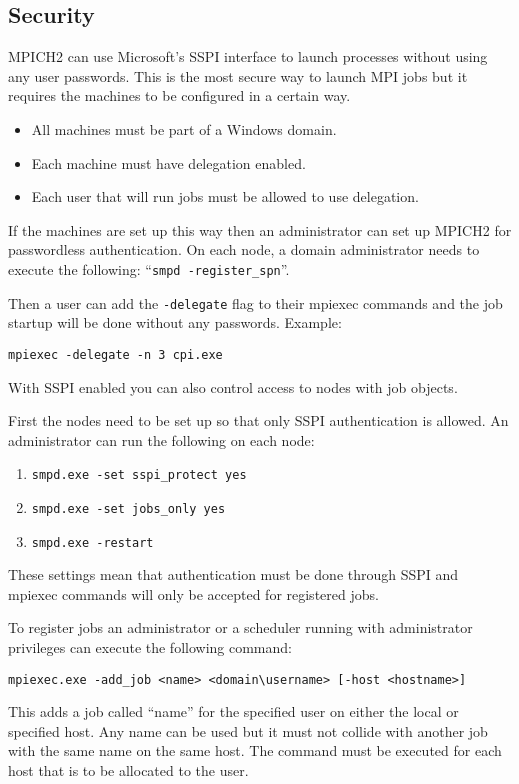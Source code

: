 \documentclass[dvipdfm,11pt]{article}
\begin{document}
\subsection{Security}
MPICH2 can use Microsoft's SSPI interface to launch processes without using any user 
passwords.  This is the most secure way to launch MPI jobs but it requires the machines to be 
configured in a certain way.
\begin{itemize}
\item All machines must be part of a Windows domain.
\item Each machine must have delegation enabled.
\item Each user that will run jobs must be allowed to use delegation.
\end{itemize}

If the machines are set up this way then an administrator can set up MPICH2 for passwordless
authentication.  On each node, a domain administrator needs to execute the following:
``\texttt{smpd -register\_spn}''.

Then a user can add the \texttt{-delegate} flag to their mpiexec commands and the job startup 
will be done without any passwords.  Example:
\begin{verbatim}
mpiexec -delegate -n 3 cpi.exe
\end{verbatim}

With SSPI enabled you can also control access to nodes with job objects.

First the nodes need to be set up so that only SSPI authentication is allowed.  An administrator
can run the following on each node:
\begin{enumerate}
\item \texttt{smpd.exe -set sspi\_protect yes}
\item \texttt{smpd.exe -set jobs\_only yes}
\item \texttt{smpd.exe -restart}
\end{enumerate}

These settings mean that authentication must be done through SSPI and mpiexec commands will only be
accepted for registered jobs.

To register jobs an administrator or a scheduler running with administrator privileges can execute
the following command:
\begin{verbatim}
mpiexec.exe -add_job <name> <domain\username> [-host <hostname>]
\end{verbatim}
This adds a job called ``name'' for the specified user on either the local or specified host.  Any
name can be used but it must not collide with another job with the same name on the same host.  The
command must be executed for each host that is to be allocated to the user.
\end{document}
